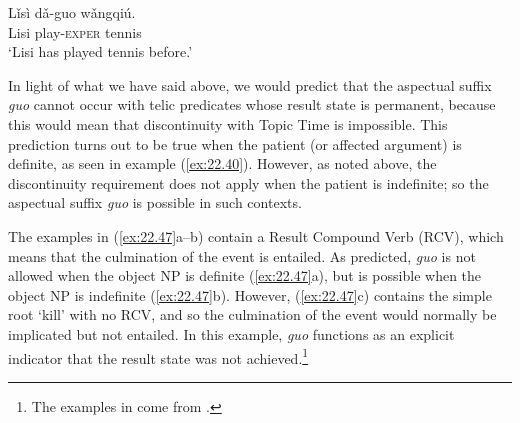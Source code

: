 \ea \label{ex:22.45}
\gll Lǐsì dǎ-guo  wǎngqiú.\\
Lisi  play-\textsc{exper}  tennis\\
\glt ‘Lisi has played tennis before.’ 
\z

\ea \label{ex:22.46}
\z \z


In light of what we have said above, we would predict that the aspectual suffix \textit{guo} cannot occur with telic predicates whose result state is permanent, because this would mean that discontinuity with Topic Time is impossible. This prediction turns out to be true when the patient (or affected argument) is definite, as seen in example (\ref{ex:22.40}). However, as noted above, the discontinuity requirement does not apply when the patient is indefinite; so the aspectual suffix \textit{guo} is possible in such contexts.



The examples in (\ref{ex:22.47}a--b) contain a Result Compound Verb (RCV), which means that the culmination of the event is entailed. As predicted, \textit{guo} is not allowed when the object NP is definite (\ref{ex:22.47}a), but is possible when the object NP is indefinite (\ref{ex:22.47}b). However, (\ref{ex:22.47}c) contains the simple root ‘kill’ with no RCV, and so the culmination of the event would normally be implicated but not entailed. In this example, \textit{guo} functions as an explicit indicator that the result state was not achieved.\footnote{The examples in  come from \citet[23]{Ma1977}.}


\ea \label{ex:22.47}

